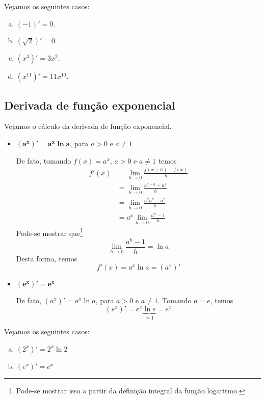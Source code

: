 \cleardoublepage\documentclass[../main.tex]{subfiles}
\begin{document}
\begin{ex}
  Vejamos os seguintes casos:
  \begin{enumerate}[a)]
  \item $(-1)' = 0$.
  \item $(\sqrt{2})' = 0$.
  \item $(x^3)' = 3x^2$.
  \item $(x^{11})' = 11x^{10}$.
  \end{enumerate}
\end{ex}

\subsection{Derivada de função exponencial}

Vejamos o cálculo da derivada de função exponencial.

\begin{itemize}
\item $\boldsymbol{(a^x)' = a^x\ln a}$, para $a>0$ e $a\neq 1$
  
  De fato, tomando $f(x) = a^x$, $a>0$ e $a\neq 1$ temos
  \begin{align*}
    f'(x) &= \lim_{h\to 0} \frac{f(x+h)-f(x)}{h}\\
          &= \lim_{h\to 0} \frac{a^{x+h}-a^x}{h} \\
          &= \lim_{h\to 0} \frac{a^xa^h-a^x}{h} \\
          &= a^x \lim_{h\to 0} \frac{a^h-1}{h}
  \end{align*}
  Pode-se mostrar que\footnote{Pode-se mostrar isso a partir da definição integral da função logaritmo.}
  \begin{equation}
    \lim_{h\to 0} \frac{a^h-1}{h} = \ln a
  \end{equation}
  Desta forma, temos
  \begin{equation}
    f'(x) = a^x\ln a = (a^x)'
  \end{equation}

\item $\boldsymbol{(e^x)' = e^x}$.

  De fato, $(a^x)' = a^x\ln a$, para $a>0$ e $a\neq 1$. Tomando $a = e$, temos
  \begin{equation}
    (e^x)' = e^x\underbrace{\ln e}_{=1} = e^x
  \end{equation}
\end{itemize}

\begin{ex}
Vejamos os seguintes casos:
\begin{enumerate}[a)]
\item $(2^x)' = 2^x\ln 2$
\item $(e^x)' = e^x$
\end{enumerate}
\end{ex}
\end{document}
